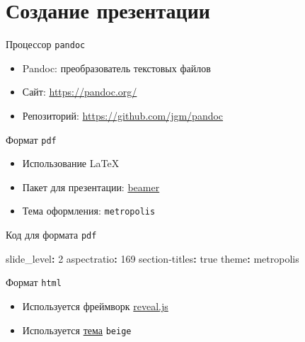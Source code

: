 \documentclass[
  ignorenonframetext,
  aspectratio=169,
  russian,
]{beamer}
\newenvironment{Shaded}{\begin{snugshade}}{\end{snugshade}}
\newcommand{\AttributeTok}[1]{\textcolor[rgb]{0.40,0.45,0.13}{#1}}
\newcommand{\CharTok}[1]{\textcolor[rgb]{0.13,0.47,0.30}{#1}}
\newcommand{\DecValTok}[1]{\textcolor[rgb]{0.68,0.00,0.00}{#1}}
\newcommand{\FunctionTok}[1]{\textcolor[rgb]{0.28,0.35,0.67}{#1}}
\newcommand{\KeywordTok}[1]{\textcolor[rgb]{0.00,0.23,0.31}{\textbf{#1}}}
\providecommand{\tightlist}{%
  \setlength{\itemsep}{0pt}\setlength{\parskip}{0pt}}\usepackage{longtable,booktabs,array}
\begin{document}
\section{Создание
презентации}\label{ux441ux43eux437ux434ux430ux43dux438ux435-ux43fux440ux435ux437ux435ux43dux442ux430ux446ux438ux438}

\begin{frame}{Процессор \texttt{pandoc}}
\label{ux43fux440ux43eux446ux435ux441ux441ux43eux440-pandoc}
\begin{itemize}[<+->]
\tightlist
\item
  Pandoc: преобразователь текстовых файлов
\item
  Сайт: \url{https://pandoc.org/}
\item
  Репозиторий: \url{https://github.com/jgm/pandoc}
\end{itemize}
\end{frame}

\begin{frame}[fragile]{Формат \texttt{pdf}}
\label{ux444ux43eux440ux43cux430ux442-pdf}
\begin{itemize}[<+->]
\tightlist
\item
  Использование LaTeX
\item
  Пакет для презентации: \href{https://ctan.org/pkg/beamer}{beamer}
\item
  Тема оформления: \texttt{metropolis}
\end{itemize}
\end{frame}

\begin{frame}[fragile]{Код для формата \texttt{pdf}}
\label{ux43aux43eux434-ux434ux43bux44f-ux444ux43eux440ux43cux430ux442ux430-pdf}
\begin{Shaded}
\begin{Highlighting}[]
\FunctionTok{slide\_level}\KeywordTok{:}\AttributeTok{ }\DecValTok{2}
\FunctionTok{aspectratio}\KeywordTok{:}\AttributeTok{ }\DecValTok{169}
\FunctionTok{section{-}titles}\KeywordTok{:}\AttributeTok{ }\CharTok{true}
\FunctionTok{theme}\KeywordTok{:}\AttributeTok{ metropolis}
\end{Highlighting}
\end{Shaded}
\end{frame}

\begin{frame}[fragile]{Формат \texttt{html}}
\label{ux444ux43eux440ux43cux430ux442-html}
\begin{itemize}[<+->]
\tightlist
\item
  Используется фреймворк \href{https://revealjs.com/}{reveal.js}
\item
  Используется \href{https://revealjs.com/themes/}{тема} \texttt{beige}
\end{itemize}
\end{frame}
\end{document}
